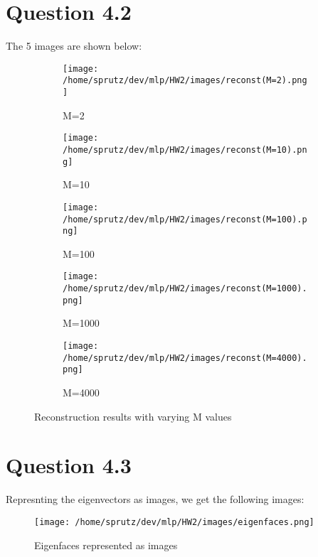 \documentclass{article}
\begin{document}
\section*{Question 4.2}
The 5 images are shown below:\\
\begin{figure}[h]
    \centering
    \begin{subfigure}[b]{0.18\textwidth}
        \centering
        \texttt{[image: /home/sprutz/dev/mlp/HW2/images/reconst(M=2).png]}
        \caption{M=2}
    \end{subfigure}
    \begin{subfigure}[b]{0.18\textwidth}
        \centering
        \texttt{[image: /home/sprutz/dev/mlp/HW2/images/reconst(M=10).png]}
        \caption{M=10}
    \end{subfigure}
    \begin{subfigure}[b]{0.18\textwidth}
        \centering
        \texttt{[image: /home/sprutz/dev/mlp/HW2/images/reconst(M=100).png]}
        \caption{M=100}
    \end{subfigure}
    \begin{subfigure}[b]{0.18\textwidth}
        \centering
        \texttt{[image: /home/sprutz/dev/mlp/HW2/images/reconst(M=1000).png]}
        \caption{M=1000}
    \end{subfigure}
    \begin{subfigure}[b]{0.18\textwidth}
        \centering
        \texttt{[image: /home/sprutz/dev/mlp/HW2/images/reconst(M=4000).png]}
        \caption{M=4000}
    \end{subfigure}
    \caption{Reconstruction results with varying M values}
\end{figure}

\section*{Question 4.3}
Represnting the eigenvectors as images, we get the following images:\\
\begin{figure}[h]
    \centering
    \texttt{[image: /home/sprutz/dev/mlp/HW2/images/eigenfaces.png]}
    \caption{Eigenfaces represented as images}
\end{figure}
\end{document}
